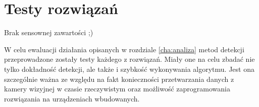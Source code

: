 \chapter{Testy rozwiązań}
\label{cha:testy}

Brak sensownej zawartości ;)


W celu ewaluacji działania opisanych w rozdziale \ref{cha:analiza} metod detekcji przeprowadzone zostały testy każdego z rozwiązań. Miały one na celu zbadać nie tylko dokładność detekcji, ale także i szybkość wykonywania algorytmu. Jest ona szczególnie ważna ze względu na fakt konieczności przetwarzania danych z kamery wizyjnej w czasie rzeczywistym oraz możliwość zaprogramowania rozwiązania na urządzeniach wbudowanych.



